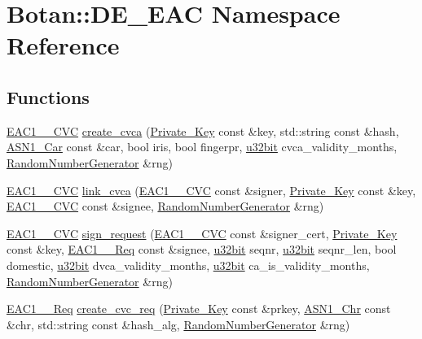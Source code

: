 \hypertarget{namespaceBotan_1_1DE__EAC}{\section{Botan\-:\-:D\-E\-\_\-\-E\-A\-C Namespace Reference}
\label{namespaceBotan_1_1DE__EAC}
}
\subsection*{Functions}
\begin{DoxyCompactItemize}
\item 
\hyperlink{classBotan_1_1EAC1__1__CVC}{E\-A\-C1\-\_\-\_\-\-C\-V\-C} \hyperlink{namespaceBotan_1_1DE__EAC_aafd6f91b47c9188f32c7f3e1780e5e08}{create\-\_\-cvca} (\hyperlink{classBotan_1_1Private__Key}{Private\-\_\-\-Key} const \&key, std\-::string const \&hash, \hyperlink{classBotan_1_1ASN1__Car}{A\-S\-N1\-\_\-\-Car} const \&car, bool iris, bool fingerpr, \hyperlink{namespaceBotan_aacc7d03c95e97e76168fc1c819031830}{u32bit} cvca\-\_\-validity\-\_\-months, \hyperlink{classBotan_1_1RandomNumberGenerator}{Random\-Number\-Generator} \&rng)
\item 
\hyperlink{classBotan_1_1EAC1__1__CVC}{E\-A\-C1\-\_\-\_\-\-C\-V\-C} \hyperlink{namespaceBotan_1_1DE__EAC_a5832d9cd287b553f1387802a4788e1f7}{link\-\_\-cvca} (\hyperlink{classBotan_1_1EAC1__1__CVC}{E\-A\-C1\-\_\-\_\-\-C\-V\-C} const \&signer, \hyperlink{classBotan_1_1Private__Key}{Private\-\_\-\-Key} const \&key, \hyperlink{classBotan_1_1EAC1__1__CVC}{E\-A\-C1\-\_\-\_\-\-C\-V\-C} const \&signee, \hyperlink{classBotan_1_1RandomNumberGenerator}{Random\-Number\-Generator} \&rng)
\item 
\hyperlink{classBotan_1_1EAC1__1__CVC}{E\-A\-C1\-\_\-\_\-\-C\-V\-C} \hyperlink{namespaceBotan_1_1DE__EAC_af1e13a03f618491870c49a04c3d5fd7d}{sign\-\_\-request} (\hyperlink{classBotan_1_1EAC1__1__CVC}{E\-A\-C1\-\_\-\_\-\-C\-V\-C} const \&signer\-\_\-cert, \hyperlink{classBotan_1_1Private__Key}{Private\-\_\-\-Key} const \&key, \hyperlink{classBotan_1_1EAC1__1__Req}{E\-A\-C1\-\_\-\_\-\-Req} const \&signee, \hyperlink{namespaceBotan_aacc7d03c95e97e76168fc1c819031830}{u32bit} seqnr, \hyperlink{namespaceBotan_aacc7d03c95e97e76168fc1c819031830}{u32bit} seqnr\-\_\-len, bool domestic, \hyperlink{namespaceBotan_aacc7d03c95e97e76168fc1c819031830}{u32bit} dvca\-\_\-validity\-\_\-months, \hyperlink{namespaceBotan_aacc7d03c95e97e76168fc1c819031830}{u32bit} ca\-\_\-is\-\_\-validity\-\_\-months, \hyperlink{classBotan_1_1RandomNumberGenerator}{Random\-Number\-Generator} \&rng)
\item 
\hyperlink{classBotan_1_1EAC1__1__Req}{E\-A\-C1\-\_\-\_\-\-Req} \hyperlink{namespaceBotan_1_1DE__EAC_afb0b8265aa40ba4509e3f8b292dcc6e7}{create\-\_\-cvc\-\_\-req} (\hyperlink{classBotan_1_1Private__Key}{Private\-\_\-\-Key} const \&prkey, \hyperlink{classBotan_1_1ASN1__Chr}{A\-S\-N1\-\_\-\-Chr} const \&chr, std\-::string const \&hash\-\_\-alg, \hyperlink{classBotan_1_1RandomNumberGenerator}{Random\-Number\-Generator} \&rng)
\end{DoxyCompactItemize}


